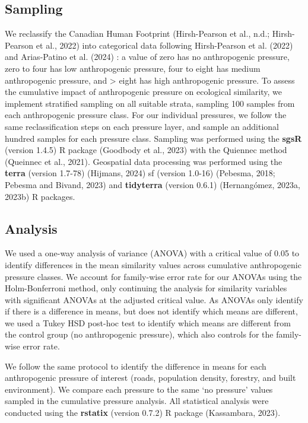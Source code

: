 \documentclass[
]{agujournal2019}
\begin{document}
\subsection{Sampling}\label{sampling}

We reclassify the Canadian Human Footprint (Hirsh-Pearson et al., n.d.;
Hirsh-Pearson et al., 2022) into categorical data following
Hirsh-Pearson et al. (2022) and Arias-Patino et al. (2024) : a value of
zero has no anthropogenic pressure, zero to four has low anthropogenic
pressure, four to eight has medium anthropogenic pressure, and
\textgreater{} eight has high anthropogenic pressure. To assess the
cumulative impact of anthropogenic pressure on ecological similarity, we
implement stratified sampling on all suitable strata, sampling 100
samples from each anthropogenic pressure class. For our individual
pressures, we follow the same reclassification steps on each pressure
layer, and sample an additional hundred samples for each pressure class.
Sampling was performed using the \textbf{sgsR} (version 1.4.5) R package
(Goodbody et al., 2023) with the Quiennec method (Queinnec et al.,
2021). Geospatial data processing was performed using the \textbf{terra}
(version 1.7-78) (Hijmans, 2024) sf (version 1.0-16) (Pebesma, 2018;
Pebesma and Bivand, 2023) and \textbf{tidyterra} (version 0.6.1)
(Hernangómez, 2023a, 2023b) R packages.

\subsection{Analysis}\label{analysis}

We used a one-way analysis of variance (ANOVA) with a critical value of
0.05 to identify differences in the mean similarity values across
cumulative anthropogenic pressure classes. We account for family-wise
error rate for our ANOVAs using the Holm-Bonferroni method, only
continuing the analysis for similarity variables with significant ANOVAs
at the adjusted critical value. As ANOVAs only identify if there is a
difference in means, but does not identify which means are different, we
used a Tukey HSD post-hoc test to identify which means are different
from the control group (no anthropogenic pressure), which also controls
for the family-wise error rate.

We follow the same protocol to identify the difference in means for each
anthropogenic pressure of interest (roads, population density, forestry,
and built environment). We compare each pressure to the same `no
pressure' values sampled in the cumulative pressure analysis. All
statistical analysis were conducted using the \textbf{rstatix} (version
0.7.2) R package (Kassambara, 2023).
\end{document}
